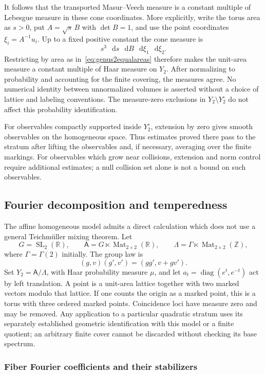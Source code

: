 \documentclass[11pt,a4paper]{article}
\numberwithin{equation}{section}
\theoremstyle{definition}
\theoremstyle{remark}
\DeclareMathOperator{\diag}{diag}
\newcommand{\dd}{\mathop{}\!\mathrm d}
\newcommand{\RR}{\mathbb R}
\newcommand{\ZZ}{\mathbb Z}
\begin{document}
It follows that the transported Masur--Veech measure is a constant
multiple of Lebesgue measure in these cone coordinates.  More
explicitly, write the torus area as $s>0$, put $A=\sqrt{s}\,B$
with $\det B=1$, and use the point coordinates $\xi_i=A^{-1}u_i$.
Up to a fixed positive constant the cone measure is
\[
 s^3\,\dd s\,\dd B\,\dd\xi_1\,\dd\xi_2.
\]
Restricting by area as in~\eqref{eq:genus2equalareas} therefore
makes the unit-area measure a constant multiple of Haar measure
on $Y_2$.  After
normalizing to probability and accounting for the finite covering,
the measures agree.  No numerical identity between unnormalized
volumes is asserted without a choice of lattice and labeling
conventions.  The measure-zero exclusions in $Y_2\setminus
Y_2^\circ$ do not affect this probability identification.

For observables compactly supported inside $Y_2^\circ$, extension
by zero gives smooth observables on the homogeneous space.  Thus
estimates proved there pass to the stratum after lifting the
observables and, if necessary, averaging over the finite markings.
For observables which grow near collisions, extension and norm
control require additional estimates; a null collision set alone
is not a bound on such observables.


\subsection{Fourier decomposition and temperedness}
\label{subsec:markedtorusconverse}

The affine homogeneous model admits a direct calculation which does
not use a general Teichm\"uller mixing theorem. Let
\[
 G=\operatorname{SL}_2(\RR),\qquad
 \mathsf A=G\ltimes\operatorname{Mat}_{2\times2}(\RR),\qquad
 \Lambda=\Gamma\ltimes\operatorname{Mat}_{2\times2}(\ZZ),
\]
where $\Gamma=\Gamma(2)$ initially. The group law is
\[
 (g,v)(g',v')=(gg',v+gv').
\]
Set $Y_2=\mathsf A/\Lambda$, with Haar probability measure $\mu$, and
let $a_t=\diag(e^t,e^{-t})$ act by left translation. A point is a
unit-area lattice together with two marked vectors modulo that
lattice. If one counts the origin as a marked point, this is a
torus with three ordered marked points. Coincidence loci have
measure zero and may be removed. Any application to a particular
quadratic stratum uses its separately established geometric
identification with this model or a finite quotient; an arbitrary
finite cover cannot be discarded without checking its base spectrum.

\subsubsection*{Fiber Fourier coefficients and their stabilizers}
\end{document}
